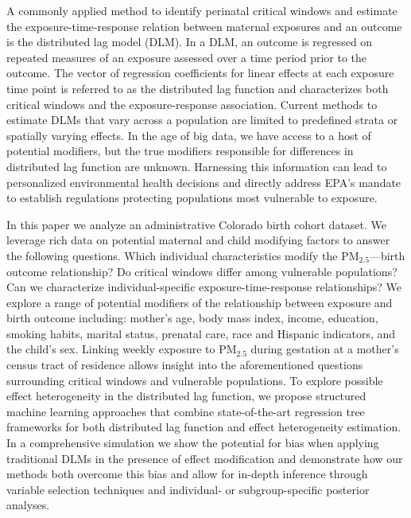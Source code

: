 \documentclass[12pt]{article}
\begin{document}
A commonly applied method to identify perinatal critical windows and estimate the exposure-time-response relation between maternal exposures and an outcome is the distributed lag model (DLM). In a DLM, an outcome is regressed on repeated measures of an exposure assessed over a time period prior to the outcome. The vector of regression coefficients for linear effects at each exposure time point is referred to as the distributed lag function and characterizes both critical windows and the exposure-response association. Current methods to estimate DLMs that vary across a population are limited to predefined strata or spatially varying effects. In the age of big data, we have access to a host of potential modifiers, but the true modifiers responsible for differences in distributed lag function are unknown. Harnessing this information can lead to personalized environmental health decisions and directly address EPA's mandate to establish regulations protecting populations most vulnerable to exposure.  



In this paper we analyze an administrative Colorado birth cohort dataset. We leverage rich data on potential maternal and child modifying factors to answer the following questions. Which individual characteristics modify the PM$_{2.5}$---birth outcome relationship? Do critical windows differ among vulnerable populations? Can we characterize individual-specific exposure-time-response relationships? We explore a range of potential modifiers of the relationship between exposure and birth outcome including: mother's age, body mass index, income, education, smoking habits, marital status, prenatal care, race and Hispanic indicators, and the child's sex. Linking weekly exposure to PM$_{2.5}$ during gestation at a mother's census tract of residence allows insight into the aforementioned questions surrounding critical windows and vulnerable populations. To explore possible effect heterogeneity in the distributed lag function, we propose structured machine learning approaches that combine state-of-the-art regression tree frameworks for both distributed lag function and effect heterogeneity estimation. In a comprehensive simulation we show the potential for bias when applying traditional DLMs in the presence of effect modification and demonstrate how our methods both overcome this bias and allow for in-depth inference through variable selection techniques and individual- or subgroup-specific posterior analyses.
\end{document}
